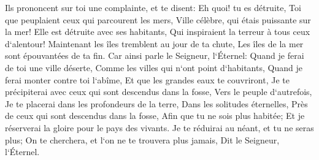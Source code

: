 \verse Ils prononcent sur toi une complainte, et te disent: Eh quoi! tu es détruite, Toi que peuplaient ceux qui parcourent les mers, Ville célèbre, qui étais puissante sur la mer! Elle est détruite avec ses habitants, Qui inspiraient la terreur à tous ceux d`alentour! 
\verse Maintenant les îles tremblent au jour de ta chute, Les îles de la mer sont épouvantées de ta fin. 
\verse Car ainsi parle le Seigneur, l`Éternel: Quand je ferai de toi une ville déserte, Comme les villes qui n`ont point d`habitants, Quand je ferai monter contre toi l`abîme, Et que les grandes eaux te couvriront, 
\verse Je te précipiterai avec ceux qui sont descendus dans la fosse, Vers le peuple d`autrefois, Je te placerai dans les profondeurs de la terre, Dans les solitudes éternelles, Près de ceux qui sont descendus dans la fosse, Afin que tu ne sois plus habitée; Et je réserverai la gloire pour le pays des vivants. 
\verse Je te réduirai au néant, et tu ne seras plus; On te cherchera, et l`on ne te trouvera plus jamais, Dit le Seigneur, l`Éternel. 

